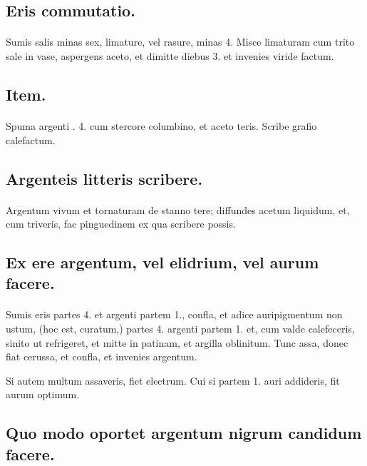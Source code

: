 \documentclass[a4paper, 11pt, oneside, polutonikogreek, italian]{article}
\begin{document}
\subsection{Eris commutatio.}
\paragraph{}
Sumis salis minas sex, limature, vel rasure, minas 4. Misce limaturam cum trito sale in vase, aspergens aceto, et dimitte diebus 3. et invenies viride factum.

\subsection{Item.}
\paragraph{}
Spuma argenti \roundz. 4. cum stercore columbino, et aceto teris. Scribe grafio calefactum.

\subsection{Argenteis litteris scribere.}
\paragraph{}
Argentum vivum et tornaturam de stanno tere; diffundes acetum liquidum, et, cum triveris, fac pinguedinem ex qua scribere possis.

\subsection{Ex ere argentum, vel elidrium, vel aurum facere.}
\paragraph{}
Sumis eris partes 4. et argenti partem 1., confla, et adice auripigmentum non ustum, (hoc est, curatum,) partes 4. argenti partem 1. et, cum valde calefeceris, sinito ut refrigeret, et mitte in patinam, et argilla oblinitum. Tunc assa, donec fiat cerussa, et confla, et invenies argentum.

Si autem multum assaveris, fiet electrum. Cui si partem 1. auri addideris, fit aurum optimum.

\subsection{Quo modo oportet argentum nigrum candidum facere.}
\end{document}

